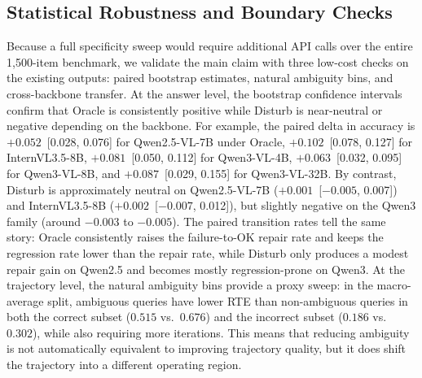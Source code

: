 \documentclass{article} %
\begin{document}
\subsection{Statistical Robustness and Boundary Checks}
Because a full specificity sweep would require additional API calls over the entire 1,500-item benchmark, we validate the main claim with three low-cost checks on the existing outputs: paired bootstrap estimates, natural ambiguity bins, and cross-backbone transfer.
At the answer level, the bootstrap confidence intervals confirm that Oracle is consistently positive while Disturb is near-neutral or negative depending on the backbone.
For example, the paired delta in accuracy is $+0.052$ \,[0.028, 0.076] for Qwen2.5-VL-7B under Oracle, $+0.102$ \,[0.078, 0.127] for InternVL3.5-8B, $+0.081$ \,[0.050, 0.112] for Qwen3-VL-4B, $+0.063$ \,[0.032, 0.095] for Qwen3-VL-8B, and $+0.087$ \,[0.029, 0.155] for Qwen3-VL-32B.
By contrast, Disturb is approximately neutral on Qwen2.5-VL-7B ($+0.001$ \,[$-0.005$, 0.007]) and InternVL3.5-8B ($+0.002$ \,[$-0.007$, 0.012]), but slightly negative on the Qwen3 family (around $-0.003$ to $-0.005$).
The paired transition rates tell the same story: Oracle consistently raises the failure-to-OK repair rate and keeps the regression rate lower than the repair rate, while Disturb only produces a modest repair gain on Qwen2.5 and becomes mostly regression-prone on Qwen3.
At the trajectory level, the natural ambiguity bins provide a proxy sweep: in the macro-average split, ambiguous queries have lower RTE than non-ambiguous queries in both the correct subset ($0.515$ vs.\ $0.676$) and the incorrect subset ($0.186$ vs.\ $0.302$), while also requiring more iterations.
This means that reducing ambiguity is not automatically equivalent to improving trajectory quality, but it does shift the trajectory into a different operating region.
\end{document}
